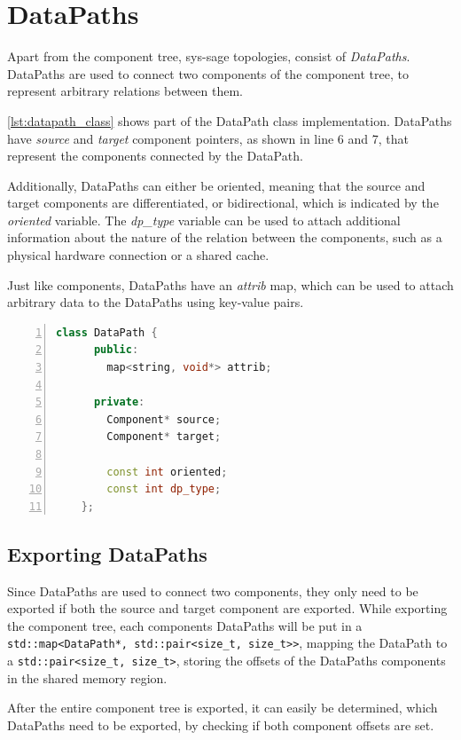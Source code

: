 \section{DataPaths}
Apart from the component tree, sys-sage topologies, consist of \emph{DataPaths}.
DataPaths are used to connect two components of the component tree, to represent arbitrary relations between them.

\autoref{lst:datapath_class} shows part of the DataPath class implementation.
DataPaths have \emph{source} and \emph{target} component pointers, as shown in line 6 and 7, that represent the components connected by the DataPath.

Additionally, DataPaths can either be oriented, meaning that the source and target components are differentiated, or bidirectional, which is indicated by the \emph{oriented} variable.
The \emph{dp\_type} variable can be used to attach additional information about the nature of the relation between the components, such as a physical hardware connection or a shared cache.

Just like components, DataPaths have an \emph{attrib} map, which can be used to attach arbitrary data to the DataPaths using key-value pairs.

\begin{lstlisting}[language=c++, numbers=left, caption=DataPath Class, captionpos=b, label={lst:datapath_class}]
    class DataPath {
      public:
        map<string, void*> attrib;

      private:
        Component* source;
        Component* target;

        const int oriented;
        const int dp_type;
    };
\end{lstlisting}

\subsection{Exporting DataPaths}\label{subsection:export_dps}
Since DataPaths are used to connect two components, they only need to be exported if both the source and target component are exported. %
While exporting the component tree, each components DataPaths will be put in a \lstinline|std::map<DataPath*, std::pair<size_t, size_t>>|,
mapping the DataPath to a \lstinline|std::pair<size_t, size_t>|, storing the offsets of the DataPaths components in the shared memory region.

After the entire component tree is exported, it can easily be determined, which DataPaths need to be exported, by checking if both component offsets are set.

